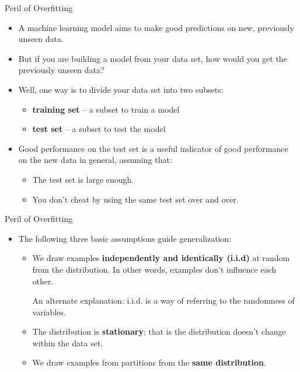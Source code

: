 \documentclass{beamer}
\begin{document}
\begin{frame}{Peril of Overfitting}
\begin{itemize}
    \item A machine learning model aims to make good predictions on new, previously unseen data. 
    \item But if you are building a model from your data set, how would you get the previously unseen data? 
    \item Well, one way is to divide your data set into two subsets:
    \begin{itemize}
        \item {\bf training set} -- a subset to train a model
        \item {\bf test set} -- a subset to test the model
    \end{itemize}
    \item Good performance on the test set is a useful indicator of good performance on the new data in general, assuming that:
    \begin{itemize}
        \item The test set is large enough.
        \item You don't cheat by using the same test set over and over.
    \end{itemize}
\end{itemize}
\end{frame}

\begin{frame}{Peril of Overfitting}
\begin{itemize}
    \item The following three basic assumptions guide generalization:
    \begin{itemize}
        \item We draw examples {\bf independently and identically (i.i.d)} at random from the distribution. In other words, examples don't influence each other. 
        
        An alternate explanation: i.i.d. is a way of referring to the randomness of variables.
        \item The distribution is {\bf stationary}; that is the distribution doesn't change within the data set.
        \item We draw examples from partitions from the {\bf same distribution}.
    \end{itemize}
\end{itemize}
\end{frame}
\end{document}
